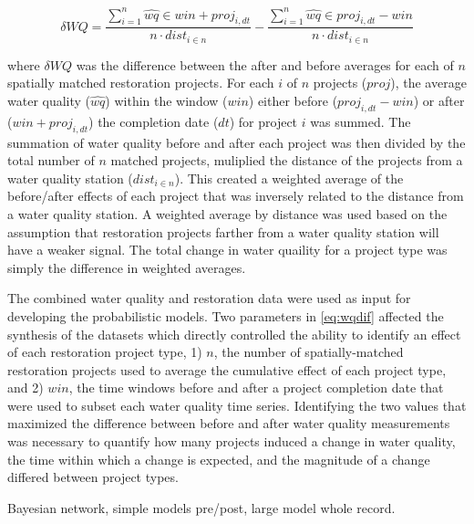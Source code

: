 \documentclass[]{article}
\begin{document}
\begin{equation}
\delta WQ = \frac{\sum_{i = 1}^{n} \hat{wq} \in win + proj_{i, dt}}{n \cdot dist_{i \in n}} - \frac{\sum_{i = 1}^{n} \hat{wq} \in proj_{i, dt} - win}{n \cdot dist_{i \in n}}
\label{eq:wqdif}
\end{equation}

where \(\delta WQ\) was the difference between the after and before
averages for each of \(n\) spatially matched restoration projects. For
each \(i\) of \(n\) projects (\(proj\)), the average water quality
(\(\hat{wq}\)) within the window (\(win\)) either before
(\(proj_{i, dt} - win\)) or after (\(win + proj_{i, dt}\)) the
completion date (\(dt\)) for project \(i\) was summed. The summation of
water quality before and after each project was then divided by the
total number of \(n\) matched projects, muliplied the distance of the
projects from a water quality station (\(dist_{i \in n}\)). This created
a weighted average of the before/after effects of each project that was
inversely related to the distance from a water quality station. A
weighted average by distance was used based on the assumption that
restoration projects farther from a water quality station will have a
weaker signal. The total change in water quaility for a project type was
simply the difference in weighted averages.

The combined water quality and restoration data were used as input for
developing the probabilistic models. Two parameters in \cref{eq:wqdif}
affected the synthesis of the datasets which directly controlled the
ability to identify an effect of each restoration project type, 1)
\(n\), the number of spatially-matched restoration projects used to
average the cumulative effect of each project type, and 2) \(win\), the
time windows before and after a project completion date that were used
to subset each water quality time series. Identifying the two values
that maximized the difference between before and after water quality
measurements was necessary to quantify how many projects induced a
change in water quality, the time within which a change is expected, and
the magnitude of a change differed between project types.

Bayesian network, simple models pre/post, large model whole record.
\end{document}
